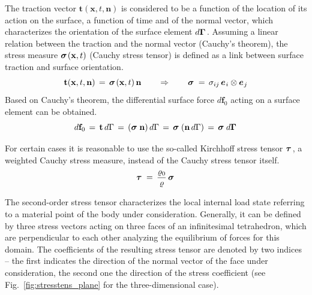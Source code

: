 The traction vector $\mathbf{t}(\mathbf{x},t,\mathbf{n})$ is considered to be a function of the location of its action on the surface, a function of time and of the normal vector, which characterizes the orientation of the surface element $d\mbox{${\mbox{\boldmath${\Gamma}$\unboldmath}}_{\:\!}$}$. Assuming a linear relation between the traction and the normal vector (Cauchy's theorem), the stress measure $\mbox{${\mbox{\boldmath${\sigma}$\unboldmath}}_{\:\!}$}(\mathbf{x},t)$ (Cauchy stress tensor) is defined as a link between surface traction and surface orientation. 
\begin{equation}
\mathbf{t}(\mathbf{x},t,\mathbf{n})\,=\,\miu{\sigma}{}{}(\mathbf{x},t)\,\mathbf{n}
\qquad\Rightarrow\qquad
\miu{\sigma}{}{}\,=\,\sigma_{ij}\,\miu{e}{i}{}\otimes\miu{e}{j}{}
\label{eq:cauchy_theorem}
\end{equation}
Based on Cauchy's theorem, the differential surface force $d\mathbf{f}_0$ acting on a surface element can be obtained. 
\begin{equation}
d\mathbf{f}_0\,=\,\mathbf{t}\,d\Gamma\,=\,(\miu{\sigma}{}{}\,\mathbf{n})\,d\Gamma\,=\,
\miu{\sigma}{}{}\,(\mathbf{n}\,d\Gamma)\,=\,\miu{\sigma}{}{}\,d\miu{\Gamma}{}{}
\label{eq:differ_surforce}
\end{equation}

For certain cases it is reasonable to use the so-called Kirchhoff stress tensor $\mbox{${\mbox{\boldmath${\tau}$\unboldmath}}_{\:\!}$}$, a weighted Cauchy stress measure, instead of the Cauchy stress tensor itself.
\begin{equation}
\mbox{${\mbox{\boldmath${\tau}$\unboldmath}}_{\:\!}$}\,=\,\frac{\varrho_0}{\varrho}\,\mbox{${\mbox{\boldmath${\sigma}$\unboldmath}}_{\:\!}$}
\end{equation}

The second-order stress tensor characterizes the local internal load state referring to a material point of the body under consideration. Generally, it can be defined by three stress vectors acting on three faces of an infinitesimal tetrahedron, which are perpendicular to each other analyzing the equilibrium of forces for this domain. The coefficients of the resulting stress tensor are denoted by two indices -- the first indicates the direction of the normal vector of the face under consideration, the second one the direction of the stress coefficient (see Fig.~\ref{fig:stresstens_plane} for the three-dimensional case).


